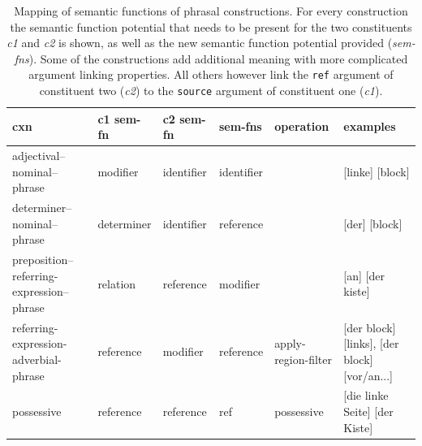 \begin{table}
\begin{centering}
\begin{small}
\begin{tabular}{| p{1.75cm} || p{1.55cm} || p{1.4cm}  || p{1.3cm} | p{1.6cm} || p{1.8cm} |}
\hline
cxn &  c1 sem-fn & c2 sem-fn & sem-fns & operation  & examples 
\\ \hline\hline

adjectival--nominal--phrase  &modifier &identifier &identifier & &[linke] [block] 
\\ \hline  
determiner--nominal--phrase  &determiner & identifier & reference & & [der] [block] 
\\ \hline
preposition--referring-expression--phrase &relation &reference & modifier &  & [an] [der kiste] 
\\ \hline  
referring-expression-adverbial-phrase  & reference & modifier & reference & 
apply-region-filter & [der block] [links], [der block] [vor/an...] 
\\ \hline  
possessive  &reference & reference & ref & possessive
& [die linke Seite] [der Kiste] 
\\ \hline  
\end{tabular}

\caption[Mapping of semantic functions]{Mapping of semantic functions of phrasal constructions. For every construction the semantic function 
potential that needs to be present for the two constituents \emph{c1} and \emph{c2} is shown, as well as the 
new semantic function potential provided (\emph{sem-fns}). Some of the constructions add additional meaning
with more complicated argument linking properties. All others however link the {\footnotesize\tt ref} argument of constituent two (\emph{c2}) to the {\footnotesize\tt source} argument of constituent one (\emph{c1}).}
\label{t:phrasal-sem}
\end{small}
\end{centering}
\end{table}

